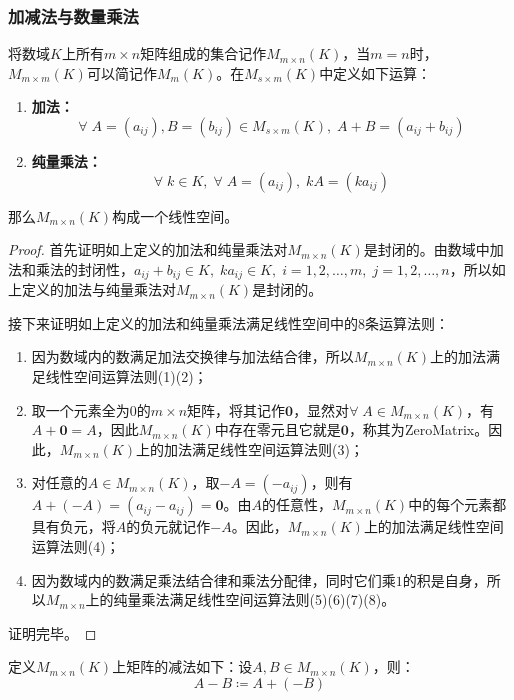 \subsubsection{加减法与数量乘法}
\begin{definition}
	将数域$K$上所有$m\times n$矩阵组成的集合记作$M_{m\times n}(K)$，当$m=n$时，$M_{m\times m}(K)$可以简记作$M_m(K)$。在$M_{s\times m}(K)$中定义如下运算：
	\begin{enumerate}
		\item \textbf{加法：} 
		\begin{equation*}
			\forall\;A=(a_{ij}),B=(b_{ij})\in M_{s\times m}(K),\;A+B=(a_{ij}+b_{ij})
		\end{equation*}
		\item \textbf{纯量乘法：}
		\begin{equation*}
			\forall\;k\in K,\;\forall\;A=(a_{ij}),\;kA=(ka_{ij})
		\end{equation*}
	\end{enumerate}
	那么$M_{m\times n}(K)$构成一个线性空间。
\end{definition}
\begin{proof}
	首先证明如上定义的加法和纯量乘法对$M_{m\times n}(K)$是封闭的。由数域中加法和乘法的封闭性，$a_{ij}+b_{ij}\in K,\;ka_{ij}\in K,\;i=1,2,\dots,m,\;j=1,2,\dots,n$，所以如上定义的加法与纯量乘法对$M_{m\times n}(K)$是封闭的。\par
	接下来证明如上定义的加法和纯量乘法满足线性空间中的8条运算法则：
	\begin{enumerate}
		\item 因为数域内的数满足加法交换律与加法结合律，所以$M_{m\times n}(K)$上的加法满足线性空间运算法则(1)(2)；
		\item 取一个元素全为$0$的$m\times n$矩阵，将其记作$\mathbf{0}$，显然对$\forall\;A\in M_{m\times n}(K)$，有$A+\mathbf{0}=A$，因此$M_{m\times n}(K)$中存在零元且它就是$\mathbf{0}$，称其为\gls{ZeroMatrix}。因此，$M_{m\times n}(K)$上的加法满足线性空间运算法则(3)；
		\item 对任意的$A\in M_{m\times n}(K)$，取$-A=(-a_{ij})$，则有$A+(-A)=(a_{ij}-a_{ij})=\mathbf{0}$。由$A$的任意性，$M_{m\times n}(K)$中的每个元素都具有负元，将$A$的负元就记作$-A$。因此，$M_{m\times n}(K)$上的加法满足线性空间运算法则(4)；
		\item 因为数域内的数满足乘法结合律和乘法分配律，同时它们乘$1$的积是自身，所以$M_{m\times n}$上的纯量乘法满足线性空间运算法则(5)(6)(7)(8)。
	\end{enumerate}
	证明完毕。
\end{proof}
\begin{definition}
	定义$M_{m\times n}(K)$上矩阵的减法如下：设$A,B\in M_{m\times n}(K)$，则：
	\begin{equation*}
		A-B\coloneq A+(-B)
	\end{equation*}
\end{definition}
